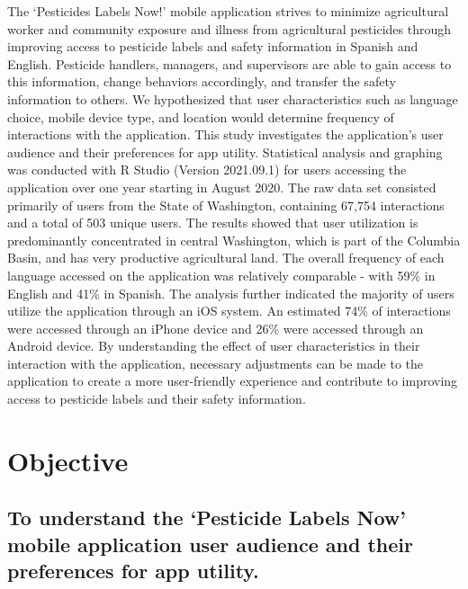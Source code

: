 \documentclass[
]{article}
\begin{document}
The `Pesticides Labels Now!' mobile application strives to minimize
agricultural worker and community exposure and illness from agricultural
pesticides through improving access to pesticide labels and safety
information in Spanish and English. Pesticide handlers, managers, and
supervisors are able to gain access to this information, change
behaviors accordingly, and transfer the safety information to others. We
hypothesized that user characteristics such as language choice, mobile
device type, and location would determine frequency of interactions with
the application. This study investigates the application's user audience
and their preferences for app utility. Statistical analysis and graphing
was conducted with R Studio (Version 2021.09.1) for users accessing the
application over one year starting in August 2020. The raw data set
consisted primarily of users from the State of Washington, containing
67,754 interactions and a total of 503 unique users. The results showed
that user utilization is predominantly concentrated in central
Washington, which is part of the Columbia Basin, and has very productive
agricultural land. The overall frequency of each language accessed on
the application was relatively comparable - with 59\% in English and
41\% in Spanish. The analysis further indicated the majority of users
utilize the application through an iOS system. An estimated 74\% of
interactions were accessed through an iPhone device and 26\% were
accessed through an Android device. By understanding the effect of user
characteristics in their interaction with the application, necessary
adjustments can be made to the application to create a more
user-friendly experience and contribute to improving access to pesticide
labels and their safety information.

\hypertarget{objective}{%
\section{Objective}\label{objective}}

\hypertarget{to-understand-the-pesticide-labels-now-mobile-application-user-audience-and-their-preferences-for-app-utility.}{%
\subsection{To understand the `Pesticide Labels Now' mobile application
user audience and their preferences for app
utility.}\label{to-understand-the-pesticide-labels-now-mobile-application-user-audience-and-their-preferences-for-app-utility.}}
\end{document}
